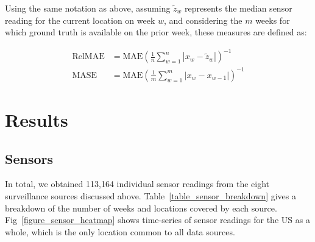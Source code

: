 \documentclass[10pt,letterpaper]{article}
\begin{document}
Using the same notation as above, assuming $\tilde{z}_w$ represents the median
sensor reading for the current location on week $w$, and considering the $m$
weeks for which ground truth is available on the prior week, these measures are
defined as:

\begin{align*}
  \text{RelMAE} &= \text{MAE} \left( \frac{1}{n} \sum_{w=1}^n{\left|x_w - \tilde{z}_w\right|} \right) ^ {-1} \\
  \text{MASE} &= \text{MAE} \left( \frac{1}{m} \sum_{w=1}^m{\left|x_w - x_{w - 1}\right|} \right) ^ {-1}
\end{align*}

\section*{Results}

\subsection*{Sensors}


In total, we obtained 113,164 individual sensor readings from the eight
surveillance sources discussed above. Table~\ref{table_sensor_breakdown} gives
a breakdown of the number of weeks and locations covered by each source.
Fig~\ref{figure_sensor_heatmap} shows time-series of sensor readings for the US
as a whole, which is the only location common to all data sources.
\end{document}
